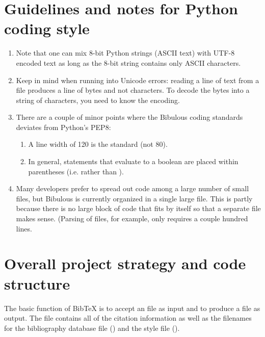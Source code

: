 \documentclass[letterpaper,10pt,english]{sphinxmanual}
\begin{document}
\section{Guidelines and notes for Python coding style}
\label{\detokenize{developer_guide:guidelines-and-notes-for-python-coding-style}}\begin{enumerate}
\item {} 
Note that one can mix 8-bit Python strings (ASCII text) with UTF-8 encoded text as long as the 8-bit string contains only ASCII characters.

\item {} 
Keep in mind when running into Unicode errors: reading a line of text from a file produces a line of bytes and not characters. To decode the bytes into a string of characters, you need to know the encoding.

\item {} 
There are a couple of minor points where the Bibulous coding standards deviates from Python’s PEP8:
\begin{enumerate}
\item {} 
A line width of 120 is the standard (not 80).

\item {} 
In general, statements that evaluate to a boolean are placed within parentheses (i.e.  rather than ).

\end{enumerate}

\item {} 
Many developers prefer to spread out code among a large number of small files, but Bibulous is currently organized in a single large file. This is partly because there is no large block of code that fits by itself so that a separate file makes sense. (Parsing of  files, for example, only requires a couple hundred lines.

\end{enumerate}


\section{Overall project strategy and code structure}
\label{\detokenize{developer_guide:overall-project-strategy-and-code-structure}}
The basic function of BibTeX is to accept an  file as input and to produce a  file as output. The  file contains all of the citation information as well as the filenames for the bibliography database file () and the style file ().
\end{document}
